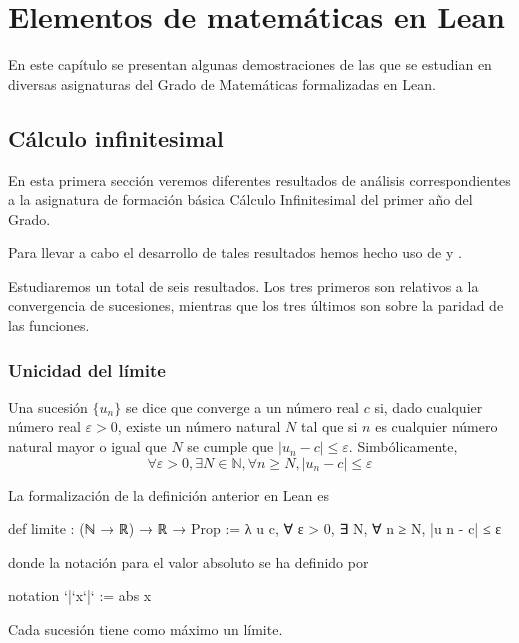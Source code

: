\chapter{Elementos de matemáticas en Lean}

En este capítulo se presentan algunas demostraciones de las que se
estudian en diversas asignaturas del Grado de Matemáticas formalizadas
en Lean.

\section{Cálculo infinitesimal}

En esta primera sección veremos diferentes resultados de análisis
correspondientes a la asignatura de formación básica Cálculo
Infinitesimal del primer año del Grado.

Para llevar a cabo el desarrollo de tales resultados hemos hecho uso
de \cite{ML} y \cite{LP}.

Estudiaremos un total de seis resultados. Los tres primeros son relativos
a la convergencia de sucesiones, mientras que los tres últimos son sobre
la paridad de las funciones.


\subsection{Unicidad del límite}

\begin{definicion}\label{limite}
  Una sucesión \(\{u_n\}\) se dice que converge a un número real \(c\) si,
  dado cualquier número real \(ε > 0\), existe un número natural \(N\)
  tal que si \(n\) es cualquier número natural mayor o igual que \(N\) se
  cumple que \(|u_n-c| ≤ ε\). Simbólicamente,
  \[∀ ε > 0, ∃ N ∈ ℕ, ∀ n ≥ N, |u_n-c| ≤ ε \]
\end{definicion}

La formalización de la definición anterior en Lean es
\begin{leancode}
def limite : (ℕ → ℝ) → ℝ → Prop :=
λ u c, ∀ ε > 0, ∃ N, ∀ n ≥ N, |u n - c| ≤ ε
\end{leancode}
donde la notación para el valor absoluto se ha definido por
\begin{leancode}
notation `|`x`|` := abs x
\end{leancode}

\begin{teorema}
Cada sucesión tiene como máximo un límite.
\end{teorema}

